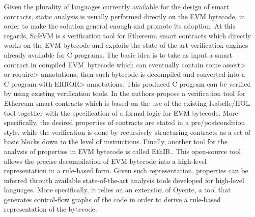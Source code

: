 Given the plurality of languages currently available for the design of smart contracts, static analysis is usually performed directly on the EVM bytecode, in order to make the solution general enough and promote its adoption. At this regards, SafeVM \cite{safevm} is s verification tool for Ethereum smart contracts which directly works on the EVM bytecode and exploits the state-of-the-art verification engines already available for C programs. The basic idea is to take as input a smart contract in compiled EVM\ bytecode which can eventually contain some \<assert> or \<require> annotations, then such bytecode is decompiled and converted into a C program with \<ERROR> annotations. This produced C program can be verified by using existing verification tools.
%
In \cite{hol_smart_constracts} the authors propose a verification tool for Ethereum smart contracts which is based on the use of the existing Isabelle/HOL tool together with the specification of a formal logic for EVM bytecode. More specifically, the desired properties  of contracts are stated in a pre/postcondition style, while the verification is done by recursively structuring contracts as a set of basic blocks
down to the level of instructions.
%
Finally, another tool for the analysis of properties in  EVM bytecode is called EthIR\,\cite{ethir}. This open-source tool allows the precise decompilation of EVM bytecode into a high-level representation in a rule-based form. Given such representation, properties can be inferred throuth available state-of-the-art analysis tools developed for high-level languages. More specifically, it relies on an extension of Oyente, a tool that generates control-flow graphs of the code in order to derive a rule-based representation of the bytecode.

